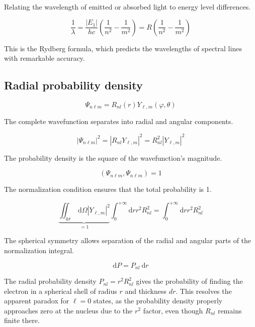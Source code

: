 \documentclass[italian]{HKNdocument}
\begin{document}
Relating the wavelength of emitted or absorbed light to energy level differences.

\begin{equation}
\frac{1}{\lambda}=\frac{\left|E_{1}\right|}{h c}\left(\frac{1}{n^{2}}-\frac{1}{m^{2}}\right)=R\left(\frac{1}{n^{2}}-\frac{1}{m^{2}}\right) \label{eq:9.94}
\end{equation}

This is the Rydberg formula, which predicts the wavelengths of spectral lines with remarkable accuracy.

\subsection{Radial probability density}

\begin{equation}
\Psi_{n \ell m}=R_{n l}(r) Y_{\ell, m}(\varphi, \theta) \label{eq:9.95}
\end{equation}

The complete wavefunction separates into radial and angular components.

\begin{equation}
\left|\Psi_{n \ell m}\right|^{2}=\left|R_{n l} Y_{\ell, m}\right|^{2}=R_{n l}^{2}\left|Y_{\ell, m}\right|^{2} \label{eq:9.96}
\end{equation}

The probability density is the square of the wavefunction's magnitude.

\begin{equation}
\left(\Psi_{n \ell m}, \Psi_{n \ell m}\right)=1 \label{eq:9.97}
\end{equation}

The normalization condition ensures that the total probability is 1.

\begin{equation}
\underbrace{\iint_{4 \pi} \mathrm{~d} \Omega\left|Y_{\ell, m}\right|^{2}}_{=1} \int_{0}^{+\infty} \mathrm{d} r r^{2} R_{n l}^{2}=\int_{0}^{+\infty} \mathrm{d} r r^{2} R_{n l}^{2} \label{eq:9.98}
\end{equation}

The spherical symmetry allows separation of the radial and angular parts of the normalization integral.

\begin{equation}
\mathrm{d} P=P_{n l} \mathrm{~d} r \label{eq:9.99}
\end{equation}

The radial probability density $P_{nl} = r^2 R_{nl}^2$ gives the probability of finding the electron in a spherical shell of radius $r$ and thickness $dr$. This resolves the apparent paradox for $\ell=0$ states, as the probability density properly approaches zero at the nucleus due to the $r^2$ factor, even though $R_{nl}$ remains finite there.
\end{document}
